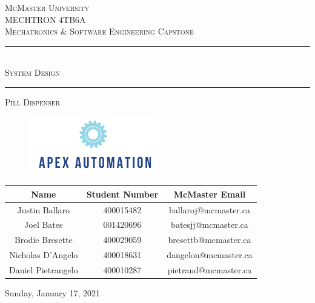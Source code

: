 \documentclass[12pt,titlepage]{article}
\begin{document}
\begin{titlepage}

\newcommand{\HRule}{\rule{\linewidth}{0.5mm}} %

\center %
 

\textsc{\LARGE McMaster University}\\[1.5cm] %
\textsc{\Large MECHTRON 4TB6A}\\[0.5cm] %
\textsc{\large Mechatronics \& Software Engineering Capstone}\\[0.5cm] %

\vspace{1cm}
\HRule \\[0.2cm]
{ \Large \vspace{0.25cm}  \textsc{  \LARGE System Design } \vspace{0.3cm} }  %
\HRule \vspace{1cm}

\textsc{\LARGE Pill Dispenser}
 
 \begin{figure}[h]
  \centering
  \includegraphics[width=.4\linewidth]{../ApexEngineering.png}
\end{figure}
 \vspace{1cm}
 

\begin{table}[ht!]
\centering
\begin{tabular}{c c c}
\toprule
\textbf{Name} & \textbf{Student Number} & \textbf{McMaster Email}         \\ \midrule
Justin Ballaro & 400015482 & ballaroj@mcmaster.ca \\
Joel Bates & 001420696 & batesjj@mcmaster.ca \\
Brodie Bresette & 400029059 & bresettb@mcmaster.ca \\
Nicholas D'Angelo & 400018631 &  dangelon@mcmaster.ca  \\
Daniel Pietrangelo & 400010287 &  pietrand@mcmaster.ca \\
  \bottomrule
\end{tabular}
\label{Tab:HU}
\end{table}

\vfill
{\large Sunday, January 17, 2021}\\[3cm] %

\end{titlepage}
\end{document}
